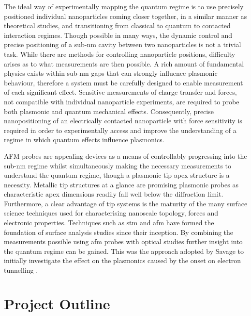 \documentclass[12pt, a4paper, twoside]{book}
\begin{document}
The ideal way of experimentally mapping the quantum regime is to use precisely positioned individual nanoparticles coming closer together, in a similar manner as theoretical studies, and transitioning from classical to quantum to contacted interaction regimes. Though possible in many ways, the dynamic control and precise positioning of a sub-nm cavity between two nanoparticles is not a trivial task. While there are methods for controlling nanoparticle positions, difficulty arises as to what measurements are then possible. A rich amount of fundamental physics exists within sub-nm gaps that can strongly influence plasmonic behaviour, therefore a system must be carefully designed to enable measurement of each significant effect. Sensitive measurements of charge transfer and forces, not compatible with individual nanoparticle experiments, are required to probe both plasmonic and quantum mechanical effects. Consequently, precise nanopositioning of an electrically contacted nanoparticle with force sensitivity is required in order to experimentally access and improve the understanding of a regime in which quantum effects influence plasmonics.

AFM probes are appealing devices as a means of controllably progressing into the sub-nm regime whilst simultaneously making the necessary measurements to understand the quantum regime, though a plasmonic tip apex structure is a necessity. Metallic tip structures at a glance are promising plasmonic probes as  characteristic apex dimensions readily fall well below the diffraction limit. Furthermore, a clear advantage of tip systems is the maturity of the many surface science techniques used for characterising nanoscale topology, forces and electronic properties. Techniques such as \gls{stm} \cite{binnig1982} and \gls{afm} \cite{binnig1986} have formed the foundation of surface analysis studies since their inception. By combining the measurements possible using \gls{afm} probes with optical studies further insight into the quantum regime can be gained. This was the approach adopted by Savage  to initially investigate the effect on the plasmonics caused by the onset on electron tunnelling \cite{savage2012}.

\section{Project Outline}
\end{document}
